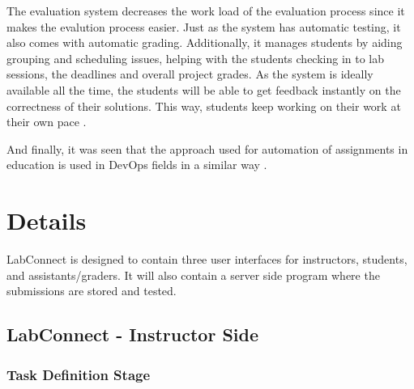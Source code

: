 \documentclass[a4paper, 12pt]{article}
\begin{document}
    The evaluation system decreases the work load of the evaluation process since it makes the evalution process easier.
    Just as the system has automatic testing, it also comes with automatic grading. Additionally, it manages students by aiding
    grouping and scheduling issues, helping with the students checking in to lab sessions, the deadlines and overall project grades.
    As the system is ideally available all the time, the students will be able to get feedback instantly on the correctness of
    their solutions. This way, students keep working on their work at their own pace \cite{Nogueira2011}.

    And finally, it was seen that the approach used for automation of assignments in education is used in DevOps fields in a similar way \cite{Faber2020}.

    \section{Details}

    LabConnect is designed to contain three user interfaces for instructors, students,
    and assistants/graders. It will also contain a server side program where the submissions
    are stored and tested.

    \subsection{LabConnect - Instructor Side}

    \subsubsection{Task Definition Stage}
\end{document}
